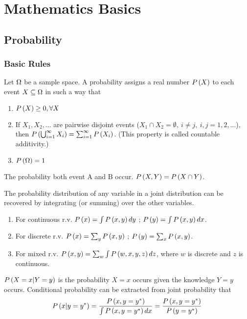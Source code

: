 
\chapter{Mathematics Basics}
\label{chapter2}

\section{Probability}
\label{section2.1}

\subsection{Basic Rules}

\begin{description}[leftmargin=0cm]
\item[Three Axioms of Probability] Let $\Om$ be a sample space. A probability assigns a real number $\P{X}$ to each event $X \subseteq \Om$ in such a way that
	\begin{enumerate}
	\item $\P{X} \geq 0, \forall X$
	\item If $X_1, X_2, \dotsc$ are pairwise disjoint events ($X_1 \cap X_2=\emptyset,\ i \ne j,\ i,j=1,2,\dotsc$), then $\P{\bigcup_{i=1}^{\infty}X_i}=\sum_{i=1}^{\infty}\P{X_i}$. (This property is called countable additivity.)
	\item $\P{\Om}=1$
	\end{enumerate}
\item[Joint Probability] The probability both event A and B occur. $\P{X,Y}=\P{X \cap Y}$.
\item[Marginalization] The probability distribution of any variable in a joint distribution can be recovered by integrating (or summing) over the other variables.
	\begin{enumerate}
	\item For continuous r.v. $\P{x}=\int\P{x,y}dy$ ; $\P{y}=\int\P{x,y}dx$.
	\item For discrete r.v. $\P{x}=\sum_y\P{x,y}$ ; $\P{y}=\sum_x\P{x,y}$.
	\item For mixed r.v. $\P{x,y}=\sum_w\int\P{w,x,y,z}dz$, where $w$ is discrete and $z$ is continuous.
	\end{enumerate}
\item[Conditional Probibility] $\P{X=x|Y=y}$ is the probability $X=x$ occurs given the knowledge $Y=y$ occurs. Conditional probability can be extracted from joint probability that
	\begin{align*}
	\P{x|y=y^{*}}=\frac{\P{x,y=y^{*}}}{\int\P{x,y=y^{*}}dx}=\frac{\P{x,y=y^{*}}}{\P{y=y^{*}}}
	\end{align*}


\end{description}
